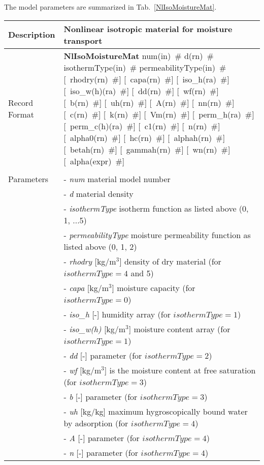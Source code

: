 \documentclass[a4paper]{article}
\newcommand{\descitem}[1]{{\noindent \bf #1}}
\newcommand{\elemparam}[2]{{{#1\tiny (#2)}~\#}}
\newcommand{\optelemparam}[2]{[{~\elemparam{#1}{#2}}]}
\newcommand{\param}[1]{{\it #1}}
\newenvironment{mmt}{\begin{tabular}{|l|p{9cm}|}}{\end{tabular}\\}
\newenvironment{mmt}{\begin{tabular}{|l|l|}}{\end{tabular}\\}
\begin{document}
The model parameters are summarized in Tab.~\ref{NlIsoMoistureMat}.
\begin{table}[!htb]
\begin{mmt}
\hline
Description & Nonlinear isotropic material for moisture transport \\
\hline
Record Format & \descitem{NlIsoMoistureMat} \elemparam{num}{in}
\elemparam{d}{rn} \elemparam{isothermType}{in} \elemparam{permeabilityType}{in}
\optelemparam{rhodry}{rn} \optelemparam{capa}{rn}
\optelemparam{iso\_h}{ra} \optelemparam{iso\_w(h)}{ra}
\optelemparam{dd}{rn} \optelemparam{wf}{rn} \optelemparam{b}{rn}
\optelemparam{uh}{rn} \optelemparam{A}{rn} \optelemparam{nn}{rn}
\optelemparam{c}{rn} \optelemparam{k}{rn} \optelemparam{Vm}{rn}
\optelemparam{perm\_h}{ra} \optelemparam{perm\_c(h)}{ra}
\optelemparam{c1}{rn} \optelemparam{n}{rn} \optelemparam{alpha0}{rn}
\optelemparam{hc}{rn} \optelemparam{alphah}{rn}
\optelemparam{betah}{rn} \optelemparam{gammah}{rn}
\optelemparam{wn}{rn} \optelemparam{alpha}{expr} \\
\\
Parameters &- \param{num} material model number \\
&- \param{d} material density \\
&- \param{isothermType} isotherm function as listed above (0, 1, ...5)
\\
&- \param{permeabilityType} moisture permeability function as listed
above (0, 1, 2) \\
&- \param{rhodry} [kg/m$^3$] density of dry material (for $isothermType=4$ and 5) \\
&- \param{capa} [kg/m$^3$] moisture capacity (for $isothermType=0$) \\
&- \param{iso\_h} [-] humidity array (for $isothermType=1$) \\
&- \param{iso\_w(h)} [kg/m$^3$] moisture content array (for
$isothermType=1$) \\
&- \param{dd} [-] parameter (for $isothermType=2$)\\
&- \param{wf} [kg/m$^3$] is the moisture content at free saturation
(for $isothermType=3$) \\
&- \param{b} [-] parameter (for $isothermType=3$) \\
&- \param{uh} [kg/kg] maximum hygroscopically
bound water by adsorption (for $isothermType=4$) \\
&- \param{A} [-] parameter (for $isothermType=4$) \\
&- \param{n} [-] parameter (for $isothermType=4$) \\

\end{mmt}
\end{table}
\end{document}

